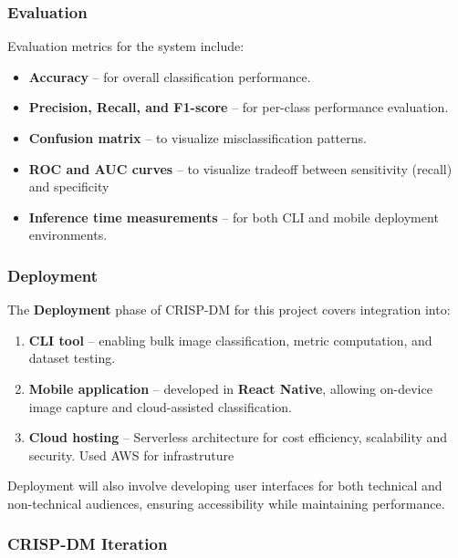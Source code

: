 \documentclass[
  12pt,
  oneside]{article}
\providecommand{\tightlist}{%
  \setlength{\itemsep}{0pt}\setlength{\parskip}{0pt}}
\begin{document}
\subsubsection{Evaluation}\label{evaluation}

Evaluation metrics for the system include:

\begin{itemize}
\tightlist
\item
  \textbf{Accuracy} -- for overall classification performance.
\item
  \textbf{Precision, Recall, and F1-score} -- for per-class performance
  evaluation.
\item
  \textbf{Confusion matrix} -- to visualize misclassification patterns.
\item
  \textbf{ROC and AUC curves} -- to visualize tradeoff between
  sensitivity (recall) and specificity
\item
  \textbf{Inference time measurements} -- for both CLI and mobile
  deployment environments.
\end{itemize}

\subsubsection{Deployment}\label{deployment}

The \textbf{Deployment} phase of CRISP-DM for this project covers
integration into:

\begin{enumerate}
\def\labelenumi{\arabic{enumi}.}
\tightlist
\item
  \textbf{CLI tool} -- enabling bulk image classification, metric
  computation, and dataset testing.
\item
  \textbf{Mobile application} -- developed in \textbf{React Native},
  allowing on-device image capture and cloud-assisted classification.
\item
  \textbf{Cloud hosting} -- Serverless architecture for cost efficiency,
  scalability and security. Used AWS for infrastruture
\end{enumerate}

Deployment will also involve developing user interfaces for both
technical and non-technical audiences, ensuring accessibility while
maintaining performance.

\subsubsection{CRISP-DM Iteration}\label{crisp-dm-iteration}
\end{document}
